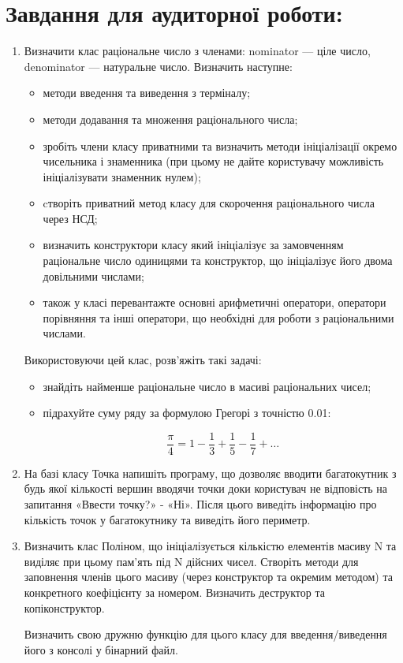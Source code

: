 \documentclass[a5paper,titlepage,openany,twoside,draft]{book_unv}%
\begin{document}
\section{Завдання для аудиторної роботи:}
\begin{enumerate}
\def\labelenumi{\arabic{enumi})}

\item 

Визначити клас раціональне число з членами: nominator --- ціле
число, denominator --- натуральне число. Визначить наступне:
\begin{itemize}
\item
методи введення та виведення з терміналу;
\item 
методи додавання та множення раціонального числа;
\item
зробіть члени класу приватними та визначить методи ініціалізації
окремо чисельника і знаменника (при цьому не дайте користувачу
можливість ініціалізувати знаменник нулем);
\item
cтворіть приватний метод класу для скорочення раціонального числа
через НСД;
\item визначить конструктори класу який ініціалізує за замовченням
раціональне число одиницями та конструктор, що ініціалізує його двома
довільними числами;
\item також у класі перевантажте основні арифметичні оператори, оператори
порівняння та інші оператори, що необхідні для роботи з раціональними
числами.
\end{itemize}

Використовуючи цей клас, розв'яжіть такі задачі:
\begin{itemize}
\item
знайдіть найменше раціональне число в масиві раціональних чисел;
\item
підрахуйте суму ряду за формулою Грегорі з точністю 0.01:

\[\frac{\pi}{4} = 1 - \frac{1}{3} + \frac{1}{5} - \frac{1}{7} + \ldots\]

\end{itemize}

\item
  На базі класу Точка напишіть програму, що дозволяє вводити
  багатокутник з будь якої кількості вершин вводячи точки доки
  користувач не відповість на запитання «Ввести точку?» - «Ні». Після
  цього виведіть інформацію про кількість точок у багатокутнику та
  виведіть його периметр.
\item
  Визначить клас Поліном, що ініціалізується кількістю елементів масиву
  N та виділяє при цьому пам'ять під N дійсних чисел. Створіть методи
  для заповнення членів цього масиву (через конструктор та окремим
  методом) та конкретного коефіцієнту за номером. Визначить деструктор
  та копіконструктор. 

  Визначить свою дружню функцію для цього класу для введення/виведення
його з консолі у бінарний файл.


\end{enumerate}
\end{document}
